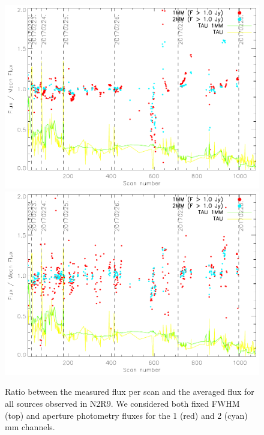 \documentclass[a4paper, 11pt]{article} %
\begin{document}
\begin{figure}
\begin{center}
\includegraphics[clip, angle=0, scale = 0.7]{Figures/FluxIndScans/flux_ratio_run22.pdf}
\includegraphics[clip, angle=0, scale = 0.7]{Figures/FluxIndScans/flux_ap_ratio_run22.pdf}
\caption{Ratio between the measured flux per scan and the averaged flux for all sources observed in N2R9. We considered both fixed FWHM (top) and aperture photometry fluxes for the 1 (red) and 2 (cyan) mm channels. }
\label{fig:fluxvsscan}
\end{center}
\end{figure}
\end{document}
